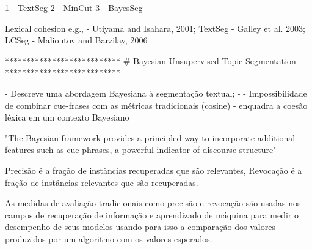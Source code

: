 


1 - TextSeg
2 - MinCut
3 - BayesSeg





Lexical cohesion e.g., 
	- Utiyama and Isahara,     2001; {TextSeg}
	- Galley et al.            2003; {LCSeg}
	- Malioutov and Barzilay,  2006  {}





***************************
# Bayesian Unsupervised Topic Segmentation
***************************

- Descreve uma abordagem Bayesiana à segmentação textual;
- 
- Impossibilidade de combinar cue-frases com as métricas tradicionais (cosine)
- {enquadra a coesão léxica em um contexto Bayesiano}

"The Bayesian framework provides a principled way to incorporate additional features such as cue phrases, a powerful indicator of discourse structure"
























Precisão é a fração de instâncias recuperadas que são relevantes, 
Revocação é a fração de instâncias relevantes que são recuperadas.





As medidas de avaliação tradicionais como precisão e revocação são usadas nos campos de recuperação de informação e aprendizado de máquina para medir o desempenho de seus modelos usando para isso a comparação dos valores produzidos por um algoritmo com os valores esperados.



